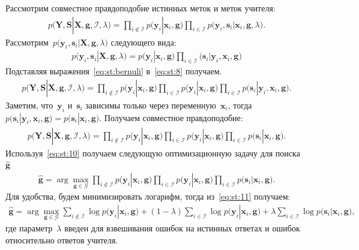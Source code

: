 \documentclass[12pt, twoside]{article}
\begin{document}
Рассмотрим совместное правдоподобие истинных меток и меток учителя:
\[
\label{eq:st:8}
\begin{aligned}
p\bigr(\mathbf{Y}, \mathbf{S}|\mathbf{X}, \mathbf{g}, \mathcal{I}, \lambda\bigr)=\prod_{i\not\in \mathcal{I}}p\bigr(\mathbf{y}_i|\mathbf{x}_i, \mathbf{g}\bigr)\prod_{i\in \mathcal{I}}p\bigr(\mathbf{y}_i, \mathbf{s}_i|\mathbf{x}_i, \mathbf{g}, \lambda\bigr).
\end{aligned}
\]
Рассмотрим~$p\bigr(\mathbf{y}_i, \mathbf{s}_i|\mathbf{X}, \mathbf{g}, \lambda\bigr)$ следующего вида:
\[
\label{eq:st:bernuli}
\begin{aligned}
p\bigr(\mathbf{y}_i, \mathbf{s}_i|\mathbf{X}, \mathbf{g}, \lambda\bigr) = p\bigr(\mathbf{y}_i|\mathbf{x}_i, \mathbf{g}\bigr)\prod_{i\in \mathcal{I}}\bigr(\mathbf{s}_i|\mathbf{y}_i, \mathbf{x}_i, \mathbf{g}\bigr)
\end{aligned}
\]
Подставляя выражения~\eqref{eq:st:bernuli} в~\eqref{eq:st:8} получаем.
\[
\label{eq:st:9}
\begin{aligned}
p\bigr(\mathbf{Y}, \mathbf{S}|\mathbf{X}, \mathbf{g}, \mathcal{I}, \lambda\bigr)=\prod_{i\not\in \mathcal{I}}p\bigr(\mathbf{y}_i|\mathbf{x}_i, \mathbf{g}\bigr)\prod_{i\in \mathcal{I}}p\bigr(\mathbf{y}_i|\mathbf{x}_i, \mathbf{g}\bigr)\prod_{i\in \mathcal{I}}p\bigr(\mathbf{s}_i|\mathbf{y}_i, \mathbf{x}_i, \mathbf{g}\bigr).
\end{aligned}
\]
Заметим, что~$\mathbf{y}_i$ и~$\mathbf{s}_i$ зависимы только через переменную~$\mathbf{x}_i$, тогда~$p\bigr(\mathbf{s}_i|\mathbf{y}_i, \mathbf{x}_i, \mathbf{g}\bigr)=p\bigr(\mathbf{s}_i|\mathbf{x}_i, \mathbf{g}\bigr)$. Получаем совместное правдоподобие:
\[
\label{eq:st:10}
\begin{aligned}
p\bigr(\mathbf{Y}, \mathbf{S}|\mathbf{X}, \mathbf{g}, \mathcal{I}, \lambda\bigr)=\prod_{i\not\in \mathcal{I}}p\bigr(\mathbf{y}_i|\mathbf{x}_i, \mathbf{g}\bigr)\prod_{i\in \mathcal{I}}p\bigr(\mathbf{y}_i|\mathbf{x}_i, \mathbf{g}\bigr)\prod_{i\in \mathcal{I}}p\bigr(\mathbf{s}_i|\mathbf{x}_i, \mathbf{g}\bigr).
\end{aligned}
\]
Используя~\eqref{eq:st:10} получаем следующую оптимизационную задачу для поиска~$\hat{\mathbf{g}}$
\[
\label{eq:st:11}
\begin{aligned}
\hat{\mathbf{g}} = \arg\max_{\mathbf{g}\in \mathcal{G}} \prod_{i\not\in \mathcal{I}}p\bigr(\mathbf{y}_i|\mathbf{x}_i, \mathbf{g}\bigr)\prod_{i\in \mathcal{I}}p\bigr(\mathbf{y}_i|\mathbf{x}_i, \mathbf{g}\bigr)\prod_{i\in \mathcal{I}}p\bigr(\mathbf{s}_i|\mathbf{x}_i, \mathbf{g}\bigr).
\end{aligned}
\]
Для удобства, будем минимизировать логарифм, тогда из~\eqref{eq:st:11} получаем:
\[
\label{eq:st:12}
\begin{aligned}
\hat{\mathbf{g}} = \arg\max_{\mathbf{g}\in \mathcal{G}} \sum_{i\not\in \mathcal{I}}\log p\bigr(\mathbf{y}_i|\mathbf{x}_i, \mathbf{g}\bigr) + \left(1-\lambda\right)\sum_{i\in \mathcal{I}}\log p\bigr(\mathbf{y}_i|\mathbf{x}_i, \mathbf{g}\bigr) + \lambda\sum_{i\in \mathcal{I}}\log p\bigr(\mathbf{s}_i|\mathbf{x}_i, \mathbf{g}\bigr),
\end{aligned}
\]
где параметр~$\lambda$ введен для взвешивания ошибок на истинных ответах и ошибок относительно ответов учителя.
\end{document}
